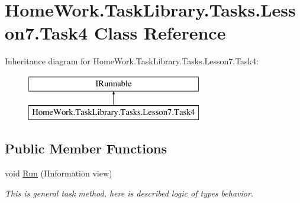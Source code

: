 \hypertarget{class_home_work_1_1_task_library_1_1_tasks_1_1_lesson7_1_1_task4}{}\section{Home\+Work.\+Task\+Library.\+Tasks.\+Lesson7.\+Task4 Class Reference}
\label{class_home_work_1_1_task_library_1_1_tasks_1_1_lesson7_1_1_task4}
Inheritance diagram for Home\+Work.\+Task\+Library.\+Tasks.\+Lesson7.\+Task4\+:\begin{figure}[H]
\begin{center}
\leavevmode
\includegraphics[height=2.000000cm]{class_home_work_1_1_task_library_1_1_tasks_1_1_lesson7_1_1_task4}
\end{center}
\end{figure}
\subsection*{Public Member Functions}
\begin{DoxyCompactItemize}
\item 
void \mbox{\hyperlink{class_home_work_1_1_task_library_1_1_tasks_1_1_lesson7_1_1_task4_a4591a8cbde2698fae7e6c90cae079b60}{Run}} (I\+Information view)
\begin{DoxyCompactList}\small\item\em This is general task method, here is described logic of types behavior. \end{DoxyCompactList}\end{DoxyCompactItemize}
